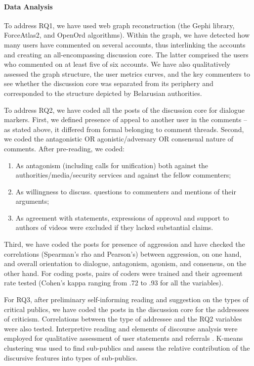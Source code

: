 \paragraph{Data Analysis}
To address RQ1, we have used web graph reconstruction (the Gephi library, ForceAtlas2, and OpenOrd algorithms). Within the graph, we have detected how many users have commented on several accounts, thus interlinking the accounts and creating an all-encompassing discussion core. The latter comprised the users who commented on at least five of six accounts. We have also qualitatively assessed the graph structure, the user metrics curves, and the key commenters to see whether the discussion core was separated from its periphery and corresponded to the structure depicted by Belarusian authorities.

To address RQ2, we have coded all the posts of the discussion core for dialogue markers. First, we defined presence of appeal to another user in the comments -- as stated above, it differed from formal belonging to comment threads. Second, we coded the antagonistic OR agonistic/adversary OR consensual nature of comments. After pre-reading, we coded:
\begin{enumerate}
	\item As antagonism (including calls for unification) both against the authorities/media/security services and against the fellow commenters;
	\item As willingness to discuss. questions to commenters and mentions of their arguments;
	\item As agreement with statements, expressions of approval and support to authors of videos were excluded if they lacked substantial claims.
\end{enumerate}

Third, we have coded the posts for presence of aggression and have checked the correlations (Spearman’s rho and Pearson’s) between aggression, on one hand, and overall orientation to dialogue, antagonism, agonism, and consensus, on the other hand. For coding posts, pairs of coders were trained and their agreement rate tested (Cohen’s kappa ranging from .72 to .93 for all the variables).

For RQ3, after preliminary self-informing reading and suggestion on the types of critical publics, we have coded the posts in the discussion core for the addressees of criticism. Correlations between the type of addressee and the RQ2 variables were also tested. Interpretive reading and elements of discourse analysis were employed for qualitative assessment of user statements and referrals \cite{Evolvi}. K-means clustering was used to find sub-publics and assess the relative contribution of the discursive features into types of sub-publics.

